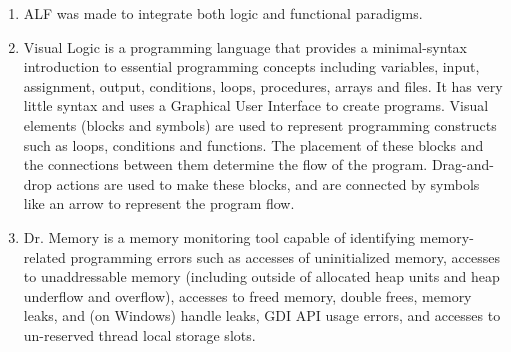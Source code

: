 \documentclass{article}
\begin{document}
\begin{enumerate}
    \item  ALF was made to integrate both logic and functional paradigms. \cite{alf}
    
    \item Visual Logic is a programming language that provides a minimal-syntax introduction to essential programming concepts including variables, input, assignment, output, conditions, loops, procedures, arrays and files. It has very little syntax and uses a Graphical User Interface to create programs. Visual elements (blocks and symbols) are used to represent programming constructs such as loops, conditions and functions. The placement of these blocks and the connections between them determine the flow of the program. Drag-and-drop actions are used to make these blocks, and are connected by symbols like an arrow to represent the program flow. \cite{vl}
    
    \item Dr. Memory is a memory monitoring tool capable of identifying memory-related programming errors such as accesses of uninitialized memory, accesses to unaddressable memory (including outside of allocated heap units and heap underflow and overflow), accesses to freed memory, double frees, memory leaks, and (on Windows) handle leaks, GDI API usage errors, and accesses to un-reserved thread local storage slots. ~\cite{drmem}
\end{enumerate}



\end{document}
